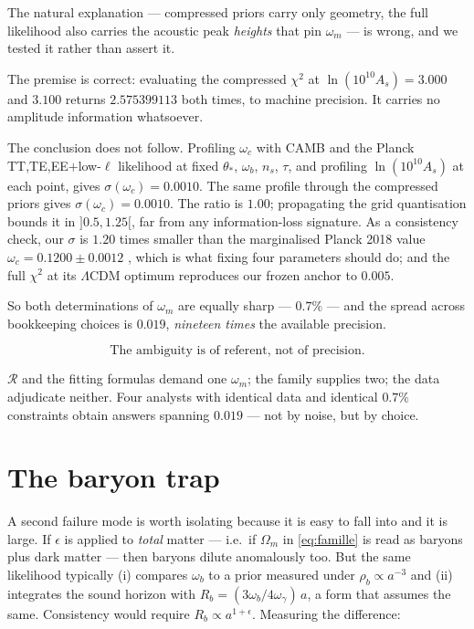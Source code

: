 \documentclass[11pt,a4paper]{article}
\begin{document}
The natural explanation --- compressed priors carry only geometry, the full likelihood also
carries the acoustic peak \emph{heights} that pin $\omega_m$ --- is wrong, and we tested it
rather than assert it.

The premise is correct: evaluating the compressed $\chi^2$ at $\ln(10^{10}A_s)=3.000$ and
$3.100$ returns $2.575399113$ both times, to machine precision. It carries no amplitude
information whatsoever.

The conclusion does not follow. Profiling $\omega_c$ with CAMB and the Planck
TT,TE,EE$+$low-$\ell$ likelihood at fixed $\theta_\ast$, $\omega_b$, $n_s$, $\tau$, and
profiling $\ln(10^{10}A_s)$ at each point, gives $\sigma(\omega_c)=0.0010$. The same
profile through the compressed priors gives $\sigma(\omega_c)=0.0010$. The ratio is
$1.00$; propagating the grid quantisation bounds it in $]0.5,1.25[$, far from any
information-loss signature. As a consistency check, our $\sigma$ is $1.20$ times smaller
than the marginalised Planck 2018 value $\omega_c=0.1200\pm0.0012$ \citep{planck2018}, which
is what fixing four parameters should do; and the full $\chi^2$ at its $\Lambda$CDM optimum
reproduces our frozen anchor to $0.005$.

So both determinations of $\omega_m$ are equally sharp --- $0.7\%$ --- and the spread across
bookkeeping choices is $0.019$, \emph{nineteen times} the available precision.

\begin{equation}
\boxed{\;\text{The ambiguity is of referent, not of precision.}\;}
\end{equation}

$\mathcal{R}$ and the fitting formulas demand one $\omega_m$; the family supplies two;
the data adjudicate neither. Four analysts with identical data and identical $0.7\%$
constraints obtain answers spanning $0.019$ --- not by noise, but by choice.

\section{The baryon trap}
\label{sec:baryons}

A second failure mode is worth isolating because it is easy to fall into and it is large.
If $\epsilon$ is applied to \emph{total} matter --- i.e.\ if $\Omega_m$ in \eqref{eq:famille}
is read as baryons plus dark matter --- then baryons dilute anomalously too. But the same
likelihood typically (i) compares $\omega_b$ to a prior measured under $\rho_b\propto a^{-3}$
and (ii) integrates the sound horizon with $R_b=(3\omega_b/4\omega_\gamma)\,a$, a form that
assumes the same. Consistency would require $R_b\propto a^{1+\epsilon}$. Measuring the
difference:
\end{document}
